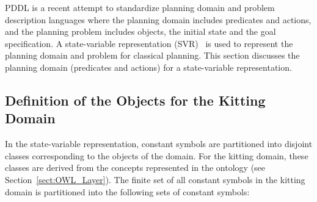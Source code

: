 PDDL is a recent attempt to standardize planning domain and problem description languages where the planning domain includes predicates and actions, and the planning problem includes objects, the initial state and the goal specification. A state-variable representation (SVR)~\cite{NAU.2004} is used to represent the planning domain and problem for classical planning. This section discusses the planning domain (predicates and actions) for a state-variable representation.

\subsection{Definition of the Objects for the Kitting Domain}
In the state-variable representation, constant symbols are partitioned into disjoint classes corresponding to the objects of the domain. For the kitting domain, these classes are derived from the concepts represented in the ontology (see Section~\ref{sect:OWL_Layer}). The finite set of all constant symbols in the kitting domain is partitioned into the following sets of constant symbols:

